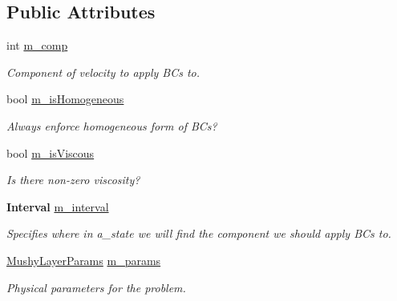 \subsection*{Public Attributes}
\begin{DoxyCompactItemize}
\item 
\mbox{\label{class_basic_c_c_vel_b_c_function_adeca967b84062f4242387b38461a8865}} 
int \hyperlink{class_basic_c_c_vel_b_c_function_adeca967b84062f4242387b38461a8865}{m\+\_\+comp}
\begin{DoxyCompactList}\small\item\em Component of velocity to apply B\+Cs to. \end{DoxyCompactList}\item 
\mbox{\label{class_basic_c_c_vel_b_c_function_ae7f9d35862d6f4d60b66a1cc2d471124}} 
bool \hyperlink{class_basic_c_c_vel_b_c_function_ae7f9d35862d6f4d60b66a1cc2d471124}{m\+\_\+is\+Homogeneous}
\begin{DoxyCompactList}\small\item\em Always enforce homogeneous form of B\+Cs? \end{DoxyCompactList}\item 
\mbox{\label{class_basic_c_c_vel_b_c_function_a58aac1d527fc1867d9dbff790b38609f}} 
bool \hyperlink{class_basic_c_c_vel_b_c_function_a58aac1d527fc1867d9dbff790b38609f}{m\+\_\+is\+Viscous}
\begin{DoxyCompactList}\small\item\em Is there non-\/zero viscosity? \end{DoxyCompactList}\item 
\mbox{\label{class_basic_c_c_vel_b_c_function_a7697caeb1754d5cca737daff6dcb2445}} 
\textbf{ Interval} \hyperlink{class_basic_c_c_vel_b_c_function_a7697caeb1754d5cca737daff6dcb2445}{m\+\_\+interval}
\begin{DoxyCompactList}\small\item\em Specifies where in a\+\_\+state we will find the component we should apply B\+Cs to. \end{DoxyCompactList}\item 
\mbox{\label{class_basic_c_c_vel_b_c_function_aefbcd5a114ca8e72723790c20feb1466}} 
\hyperlink{class_mushy_layer_params}{Mushy\+Layer\+Params} \hyperlink{class_basic_c_c_vel_b_c_function_aefbcd5a114ca8e72723790c20feb1466}{m\+\_\+params}
\begin{DoxyCompactList}\small\item\em Physical parameters for the problem. \end{DoxyCompactList}\end{DoxyCompactItemize}


